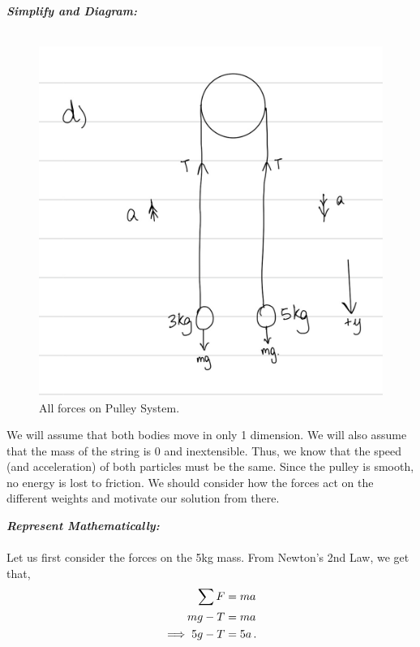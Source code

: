 \begin{subquestions}
\textbf{\textit{Simplify and Diagram:}} \\ \\
\begin{figure}[H]
	\begin{center}
		\includegraphics[scale=0.25]{../2015/figures/2015q6-4}
		\caption{\label{2015:q6:fig:Diagram4} All forces on Pulley System.}
	\end{center}
\end{figure}
We will assume that both bodies move in only 1 dimension. We will also assume that the mass of the string is 0 and inextensible. Thus, we know that the speed (and acceleration) of both particles must be the same. Since the pulley is smooth, no energy is lost to friction. We should consider how the forces act on the different weights and motivate our solution from there.




\textbf{\textit{Represent Mathematically:}} \\ \\
Let us first consider the forces on the 5kg mass. From Newton's 2nd Law, we get that,
\begin{align}
	\sum F & = ma \nonumber \\
	mg - T & = ma \nonumber \\
	\implies 5g-T & = 5a \,. \label{2015:q6:PulleyEq1}
\end{align}


\end{subquestions}
